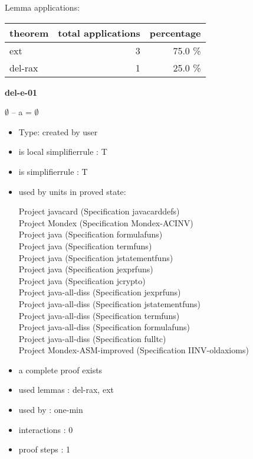 \documentclass[a4paper]{article}
\begin{document}
Lemma applications:

\begin{supertabular}{l|r|r}
theorem	        & total applications & percentage \\ \hline
ext & 3 & 75.0 \% \\
del-rax & 1 & 25.0 \% \\

\end{supertabular}
\pagebreak

{\LARGE\bf del-e-01}\label{lemma-del-e-01}

\medskip

 \Fol $\emptyset$ -- a = $\emptyset$

\begin{itemize}

\item Type: created by user

\item is local simplifierrule : T
\item is simplifierrule : T
\item used by units in proved state:

Project javacard (Specification javacarddefs) \\
Project Mondex (Specification Mondex-ACINV) \\
Project java (Specification formulafuns) \\
Project java (Specification termfuns) \\
Project java (Specification jstatementfuns) \\
Project java (Specification jexprfuns) \\
Project java (Specification jcrypto) \\
Project java-all-diss (Specification jexprfuns) \\
Project java-all-diss (Specification jstatementfuns) \\
Project java-all-diss (Specification termfuns) \\
Project java-all-diss (Specification formulafuns) \\
Project java-all-diss (Specification fulltc) \\
Project Mondex-ASM-improved (Specification IINV-oldaxioms)
\item       a complete proof exists
\item       used lemmas  : del-rax, ext
\item       used by      : one-min
\item       interactions : 0
\item       proof steps  : 1
\end{itemize}
\end{document}
